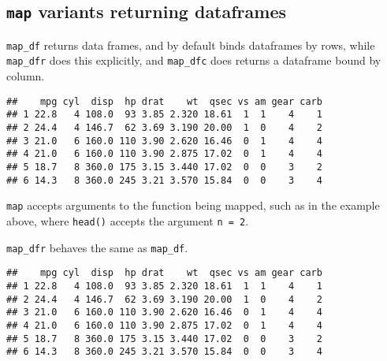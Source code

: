 \documentclass[
]{book}
\newenvironment{Shaded}{}{}
\newcommand{\CommentTok}[1]{\textcolor[rgb]{0.38,0.63,0.69}{\textit{#1}}}
\newcommand{\DataTypeTok}[1]{\textcolor[rgb]{0.56,0.13,0.00}{#1}}
\newcommand{\DecValTok}[1]{\textcolor[rgb]{0.25,0.63,0.44}{#1}}
\newcommand{\KeywordTok}[1]{\textcolor[rgb]{0.00,0.44,0.13}{\textbf{#1}}}
\newcommand{\NormalTok}[1]{#1}
\newcommand{\OperatorTok}[1]{\textcolor[rgb]{0.40,0.40,0.40}{#1}}
\newcommand{\StringTok}[1]{\textcolor[rgb]{0.25,0.44,0.63}{#1}}
\begin{document}
\hypertarget{map-variants-returning-dataframes}{%
\subsection{\texorpdfstring{\texttt{map} variants returning dataframes}{map variants returning dataframes}}\label{map-variants-returning-dataframes}}

\texttt{map\_df} returns data frames, and by default binds dataframes by rows, while \texttt{map\_dfr} does this explicitly, and \texttt{map\_dfc} does returns a dataframe bound by column.

\begin{Shaded}
\end{Shaded}

\begin{verbatim}
##    mpg cyl  disp  hp drat    wt  qsec vs am gear carb
## 1 22.8   4 108.0  93 3.85 2.320 18.61  1  1    4    1
## 2 24.4   4 146.7  62 3.69 3.190 20.00  1  0    4    2
## 3 21.0   6 160.0 110 3.90 2.620 16.46  0  1    4    4
## 4 21.0   6 160.0 110 3.90 2.875 17.02  0  1    4    4
## 5 18.7   8 360.0 175 3.15 3.440 17.02  0  0    3    2
## 6 14.3   8 360.0 245 3.21 3.570 15.84  0  0    3    4
\end{verbatim}

\texttt{map} accepts arguments to the function being mapped, such as in the example above, where \texttt{head()} accepts the argument \texttt{n\ =\ 2}.

\texttt{map\_dfr} behaves the same as \texttt{map\_df}.

\begin{Shaded}
\end{Shaded}

\begin{verbatim}
##    mpg cyl  disp  hp drat    wt  qsec vs am gear carb
## 1 22.8   4 108.0  93 3.85 2.320 18.61  1  1    4    1
## 2 24.4   4 146.7  62 3.69 3.190 20.00  1  0    4    2
## 3 21.0   6 160.0 110 3.90 2.620 16.46  0  1    4    4
## 4 21.0   6 160.0 110 3.90 2.875 17.02  0  1    4    4
## 5 18.7   8 360.0 175 3.15 3.440 17.02  0  0    3    2
## 6 14.3   8 360.0 245 3.21 3.570 15.84  0  0    3    4
\end{verbatim}
\end{document}
